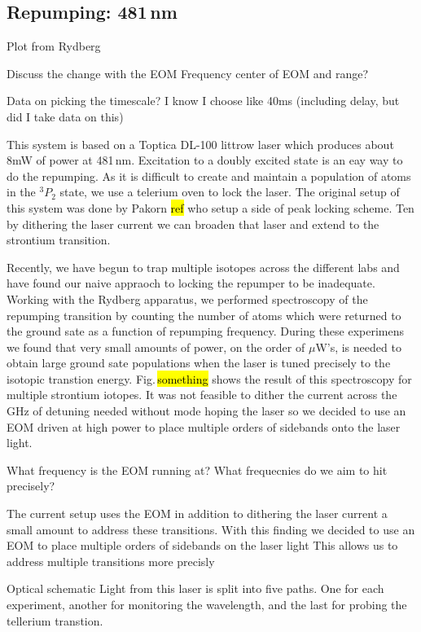 \subsection{Repumping: 481\,nm}
\label{ssec:481sys}

Plot from Rydberg

Discuss the change with the EOM
	Frequency center of EOM and range?
	
Data on picking the timescale?
	I know I choose like 40ms (including delay, but did I take data on this)

This system is based on a Toptica DL-100 littrow laser which produces about 8mW of power at 481\,nm. 
Excitation to a doubly excited state is an eay way to do the repumping.
As it is difficult to create and maintain a population of atoms in the $^3P_2$ state, we use a telerium oven to lock the laser.
The original setup of this system was done by Pakorn \hl{ref} who setup a side of peak locking scheme. 
Ten by dithering the laser current we can broaden that laser and extend to the strontium transition.

Recently, we have begun to trap multiple isotopes across the different labs and have found our naive appraoch to locking the repumper to be inadequate.
Working with the Rydberg apparatus, we performed spectroscopy of the repumping transition by counting the number of atoms which were returned to the ground sate as a function of repumping frequency.
During these experimens we found that very small amounts of power, on the order of $\mu$W's, is needed to obtain large ground sate populations when the laser is tuned precisely to the isotopic transtion energy. 
Fig.\,\hl{something} shows the result of this spectroscopy for multiple strontium iotopes.
It was not feasible to dither the current across the GHz of detuning needed without mode hoping the laser so we decided to use an EOM driven at high power to place multiple orders of sidebands onto the laser light.

What frequency is the EOM running at?
What frequecnies do we aim to hit precisely?

The current setup uses the EOM in addition to dithering the laser current a small amount to address these transitions.
With this finding we decided to use an EOM to place multiple orders of sidebands on the laser light
This allows us to address multiple transitions more precisly

Optical schematic
Light from this laser is split into five paths.
One for each experiment, another for monitoring the wavelength, and the last for probing the tellerium transtion.

